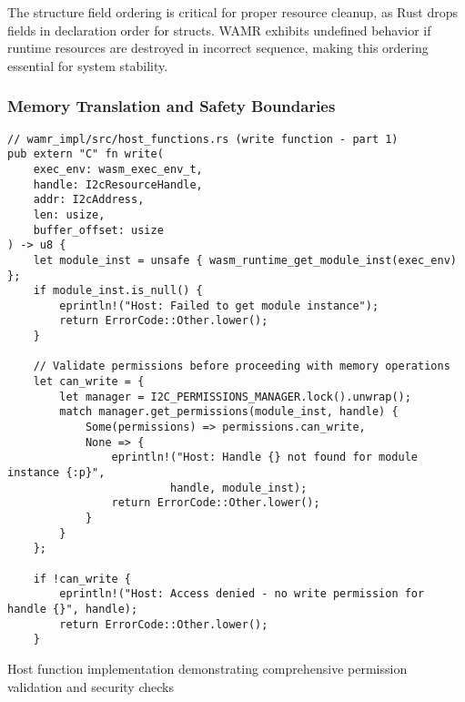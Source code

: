The structure field ordering is critical for proper resource cleanup, as Rust drops fields in declaration order for structs. WAMR exhibits undefined behavior if runtime resources are destroyed in incorrect sequence, making this ordering essential for system stability.

\subsubsection{Memory Translation and Safety Boundaries}

\begin{listing}[H]
\begin{verbatim}
// wamr_impl/src/host_functions.rs (write function - part 1)
pub extern "C" fn write(
    exec_env: wasm_exec_env_t,
    handle: I2cResourceHandle,
    addr: I2cAddress,
    len: usize,
    buffer_offset: usize
) -> u8 {
    let module_inst = unsafe { wasm_runtime_get_module_inst(exec_env) };
    if module_inst.is_null() {
        eprintln!("Host: Failed to get module instance");
        return ErrorCode::Other.lower();
    }

    // Validate permissions before proceeding with memory operations
    let can_write = {
        let manager = I2C_PERMISSIONS_MANAGER.lock().unwrap();
        match manager.get_permissions(module_inst, handle) {
            Some(permissions) => permissions.can_write,
            None => {
                eprintln!("Host: Handle {} not found for module instance {:p}", 
                         handle, module_inst);
                return ErrorCode::Other.lower();
            }
        }
    };

    if !can_write {
        eprintln!("Host: Access denied - no write permission for handle {}", handle);
        return ErrorCode::Other.lower();
    }
\end{verbatim}
\caption{Host function implementation demonstrating comprehensive permission validation and security checks}
\label{lst:wamr-host-function-pt1}
\end{listing}

